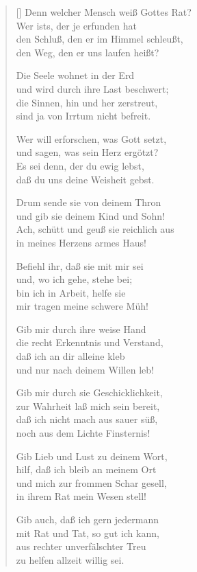 \begin{multicols}{2}
\begin{verse}[\versewidth]
 Denn welcher Mensch weiß Gottes Rat?\\
Wer ists, der je erfunden hat\\
den Schluß, den er im Himmel schleußt,\\
den Weg, den er uns laufen heißt?

 Die Seele wohnet in der Erd\\
und wird durch ihre Last beschwert;\\
die Sinnen, hin und her zerstreut,\\
sind ja von Irrtum nicht befreit.

 Wer will erforschen, was Gott setzt,\\
und sagen, was sein Herz ergötzt?\\
Es sei denn, der du ewig lebst,\\
daß du uns deine Weisheit gebst.

 Drum sende sie von deinem Thron\\
und gib sie deinem Kind und Sohn!\\
Ach, schütt und geuß sie reichlich aus\\
in meines Herzens armes Haus!

 Befiehl ihr, daß sie mit mir sei\\
und, wo ich gehe, stehe bei;\\
bin ich in Arbeit, helfe sie\\
mir tragen meine schwere Müh!

 Gib mir durch ihre weise Hand\\
die recht Erkenntnis und Verstand,\\
daß ich an dir alleine kleb\\
und nur nach deinem Willen leb!

 Gib mir durch sie Geschicklichkeit,\\
zur Wahrheit laß mich sein bereit,\\
daß ich nicht mach aus sauer süß,\\
noch aus dem Lichte Finsternis!

 Gib Lieb und Lust zu deinem Wort,\\
hilf, daß ich bleib an meinem Ort\\
und mich zur frommen Schar gesell,\\
in ihrem Rat mein Wesen stell!

 Gib auch, daß ich gern jedermann\\
mit Rat und Tat, so gut ich kann,\\
aus rechter unverfälschter Treu\\
zu helfen allzeit willig sei.

\end{verse}
\end{multicols}

